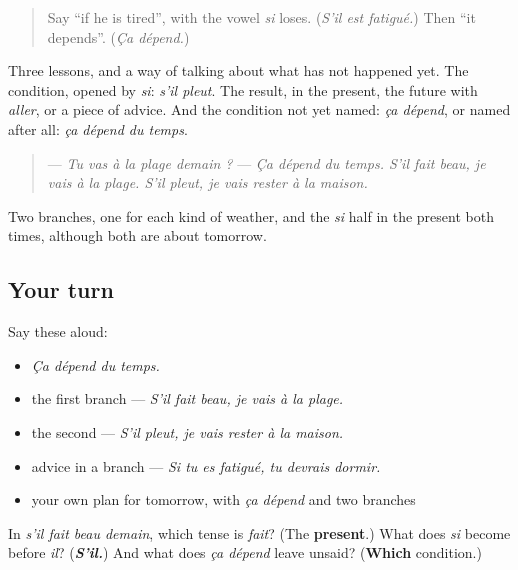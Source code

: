 \begin{quote}
Say \textquotedblleft{}if he is tired\textquotedblright{}, with the vowel \emph{si} loses. (\emph{S'il est fatigué.}) Then \textquotedblleft{}it depends\textquotedblright{}. (\emph{Ça dépend.})
\end{quote}

\begin{grammarlens}[title={What you've built}]
Three lessons, and a way of talking about what has not happened yet. The condition, opened by \emph{si}: \emph{s'il pleut}. The result, in the present, the future with \emph{aller}, or a piece of advice. And the condition not yet named: \emph{ça dépend}, or named after all: \emph{ça dépend du temps}.

\begin{quote}
— \emph{Tu vas à la plage demain ?} — \emph{Ça dépend du temps. S'il fait beau, je vais à la plage. S'il pleut, je vais rester à la maison.}
\end{quote}

Two branches, one for each kind of weather, and the \emph{si} half in the present both times, although both are about tomorrow.
\end{grammarlens}

\subsection*{Your turn}
Say these aloud:

\begin{itemize}
\raggedright
  \item \emph{Ça dépend du temps.}
  \item the first branch — \emph{S'il fait beau, je vais à la plage.}
  \item the second — \emph{S'il pleut, je vais rester à la maison.}
  \item advice in a branch — \emph{Si tu es fatigué, tu devrais dormir.}
  \item your own plan for tomorrow, with \emph{ça dépend} and two branches
\end{itemize}

\begin{tcolorbox}[breakable,colback=teal!4,colframe=teal!35!black,title={Before you move on}]
In \emph{s'il fait beau demain}, which tense is \emph{fait}? (The \textbf{present}.) What does \emph{si} become before \emph{il}? (\emph{\textbf{S'il.}}) And what does \emph{ça dépend} leave unsaid? (\textbf{Which} condition.)
\end{tcolorbox}
